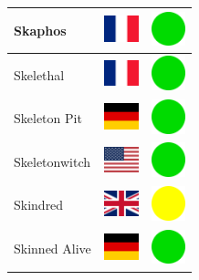 \documentclass[12pt, a4paper, twoside]{report}
\begin{document}
\begin{center}
\begin{longtable}{|p{5cm}|p{2cm}|p{2cm}|}
 Skaphos                                                    & \includegraphics[width=1cm]{../4x3/fr} &   \includegraphics[width=1cm]{../likes/y} \\ \hline
 Skelethal                                                  & \includegraphics[width=1cm]{../4x3/fr} &   \includegraphics[width=1cm]{../likes/y} \\ \hline
 Skeleton Pit                                               & \includegraphics[width=1cm]{../4x3/de} &   \includegraphics[width=1cm]{../likes/y} \\ \hline
 Skeletonwitch                                              & \includegraphics[width=1cm]{../4x3/us} &   \includegraphics[width=1cm]{../likes/y} \\ \hline
 Skindred                                                   & \includegraphics[width=1cm]{../4x3/gb} &   \includegraphics[width=1cm]{../likes/m} \\ \hline
 Skinned Alive                                              & \includegraphics[width=1cm]{../4x3/de} &   \includegraphics[width=1cm]{../likes/y} \\ \hline

\end{longtable}
\end{center}
\end{document}
